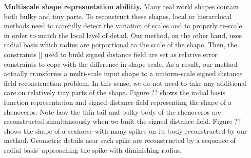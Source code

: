 \documentclass[annual]{acmsiggraph}
\begin{document}
\textbf{Multiscale shape represnetation abilitiy. } 
Many real world shapes contain both bulky and tiny parts. To reconstruct these shapes, local or hierarchical methods need to carefully detect the variation of scales and to properly re-scale in order to match the local level of detail. Our method, on the other hand, uses radial basis which radius are porportional to the scale of the shape. Then, the constraints [] used to build signed distance field are set as relative error constraints to cope with the difference in shape scale. As a result, our method actually transforms a multi-scale input shape to a uniform-scale signed distance field reconstruction problem. In this sense, we do not need to take any additional care on relatively tiny parts of the shape. Figure ?? shows the radial basis function representation and signed distance field representing the shape of a rhenoceros. Note how the thin tail and bulky body of the rhenoceros are reconstructed simultaneously when we built the signed distance field. Figure ?? shows the shape of a seahorse with many spikes on its body reconstructed by our method. Geometric details near each spike are reconstructed by a sequence of radial basis' approaching the spike with diminishing radius. 
\end{document}
